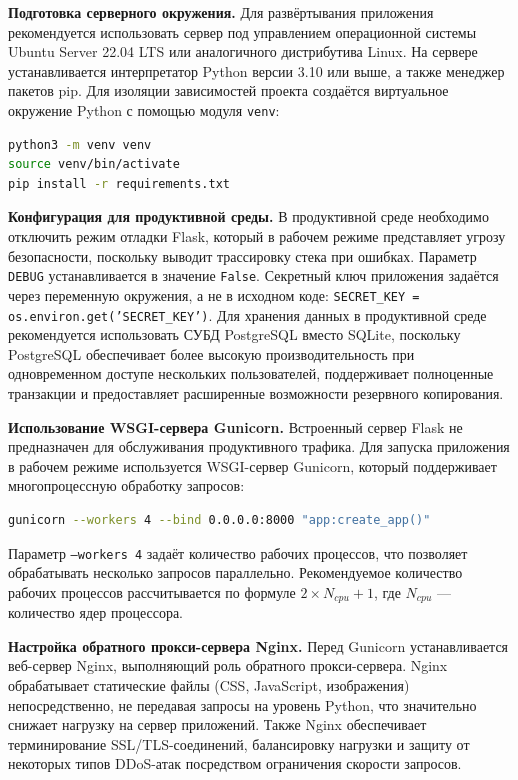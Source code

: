 \documentclass[14pt,a4paper,oneside]{extarticle}
\begin{document}
\textbf{Подготовка серверного окружения.} Для развёртывания приложения рекомендуется использовать сервер под управлением операционной системы Ubuntu Server 22.04 LTS или аналогичного дистрибутива Linux. На сервере устанавливается интерпретатор Python версии 3.10 или выше, а также менеджер пакетов pip. Для изоляции зависимостей проекта создаётся виртуальное окружение Python с помощью модуля \texttt{venv}:

\begin{lstlisting}[language=bash, caption={Создание виртуального окружения и установка зависимостей}, label={lst:deploy-venv}]
python3 -m venv venv
source venv/bin/activate
pip install -r requirements.txt
\end{lstlisting}

\textbf{Конфигурация для продуктивной среды.} В продуктивной среде необходимо отключить режим отладки Flask, который в рабочем режиме представляет угрозу безопасности, поскольку выводит трассировку стека при ошибках. Параметр \texttt{DEBUG} устанавливается в значение \texttt{False}. Секретный ключ приложения задаётся через переменную окружения, а не в исходном коде: \texttt{SECRET\_KEY = os.environ.get('SECRET\_KEY')}. Для хранения данных в продуктивной среде рекомендуется использовать СУБД PostgreSQL вместо SQLite, поскольку PostgreSQL обеспечивает более высокую производительность при одновременном доступе нескольких пользователей, поддерживает полноценные транзакции и предоставляет расширенные возможности резервного копирования.

\textbf{Использование WSGI-сервера Gunicorn.} Встроенный сервер Flask не предназначен для обслуживания продуктивного трафика. Для запуска приложения в рабочем режиме используется WSGI-сервер Gunicorn, который поддерживает многопроцессную обработку запросов:

\begin{lstlisting}[language=bash, caption={Запуск приложения через Gunicorn}, label={lst:gunicorn}]
gunicorn --workers 4 --bind 0.0.0.0:8000 "app:create_app()"
\end{lstlisting}

Параметр \texttt{--workers 4} задаёт количество рабочих процессов, что позволяет обрабатывать несколько запросов параллельно. Рекомендуемое количество рабочих процессов рассчитывается по формуле $2 \times N_{cpu} + 1$, где $N_{cpu}$ --- количество ядер процессора.

\textbf{Настройка обратного прокси-сервера Nginx.} Перед Gunicorn устанавливается веб-сервер Nginx, выполняющий роль обратного прокси-сервера. Nginx обрабатывает статические файлы (CSS, JavaScript, изображения) непосредственно, не передавая запросы на уровень Python, что значительно снижает нагрузку на сервер приложений. Также Nginx обеспечивает терминирование SSL/TLS-соединений, балансировку нагрузки и защиту от некоторых типов DDoS-атак посредством ограничения скорости запросов.
\end{document}

